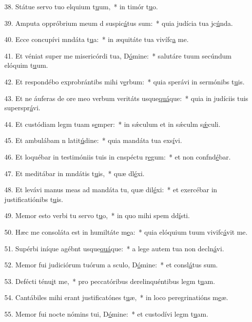 38. Státue servo tuo elquium t\uline{u}um,~* in timór t\uline{u}o.\par 
39. Amputa oppróbrium meum d suspic\uline{á}tus sum:~* quia judícia tua jc\uline{ú}nda.\par 
40. Ecce concupívi mndáta t\uline{u}a:~* in æquitáte tua vivífc\uline{a} me.\par 
41. Et véniat super me misericórdi tua, D\uline{ó}mine:~* salutáre tuum secúndum elóquim t\uline{u}um.\par 
42. Et respondébo exprobrántibs mihi v\uline{e}rbum:~* quia sperávi in sermónibs t\uline{u}is.\par 
43. Et ne áuferas de ore meo verbum veritáts usque\uline{quá}que:~* quia in judíciis tuis superspr\uline{á}vi.\par 
44. Et custódiam legm tuam s\uline{e}mper:~* in sǽculum et in sǽculm s\uline{ǽ}culi.\par 
45. Et ambulábam n latit\uline{ú}dine:~* quia mandáta tua exs\uline{í}vi.\par 
46. Et loquébar in testimóniis tuis in cnspéctu r\uline{e}gum:~* et non confnd\uline{é}bar.\par 
47. Et meditábar in mndátis t\uline{u}is,~* quæ dl\uline{é}xi.\par 
48. Et levávi manus meas ad mandáta tu, quæ dil\uline{é}xi:~* et exercébar in justificatiónibs t\uline{u}is.\par 
49. Memor esto verbi tu servo t\uline{u}o,~* in quo mihi spem dd\uline{í}sti.\par 
50. Hæc me consoláta est in humiltáte m\uline{e}a:~* quia elóquium tuum vivifc\uline{á}vit me.\par 
51. Supérbi iníque agébnt usque\uline{quá}que:~* a lege autem tua non decln\uline{á}vi.\par 
52. Memor fui judiciórum tuórum a sculo, D\uline{ó}mine:~* et consl\uline{á}tus sum.\par 
53. Defécti ténu\uline{i}t me,~* pro peccatóribus derelinquéntibus legm t\uline{u}am.\par 
54. Cantábiles mihi erant justificatónes t\uline{u}æ,~* in loco peregrinatións m\uline{e}æ.\par 
55. Memor fui nocte nómins tui, D\uline{ó}mine:~* et custodívi legm t\uline{u}am.\par 

